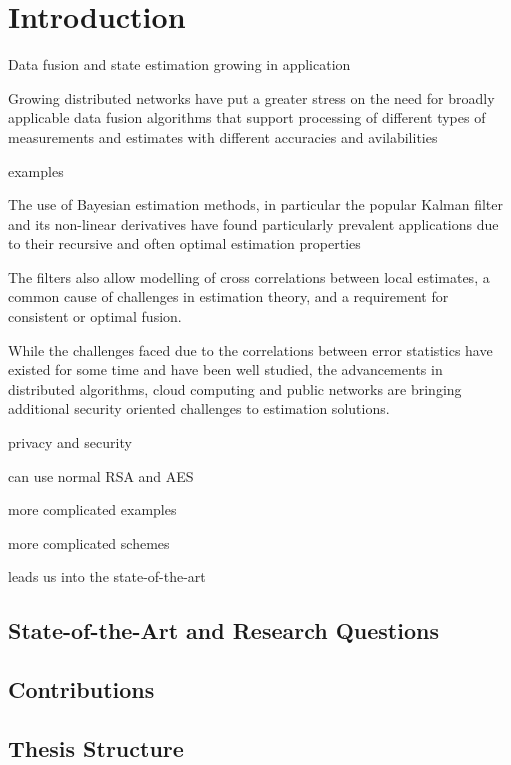 
\chapter{Introduction}

Data fusion and state estimation growing in application

Growing distributed networks have put a greater stress on the need for broadly applicable data fusion algorithms that support processing of different types of measurements and estimates with different accuracies and avilabilities

examples

The use of Bayesian estimation methods, in particular the popular Kalman filter and its non-linear derivatives have found particularly prevalent applications due to their recursive and often optimal estimation properties 

The filters also allow modelling of cross correlations between local estimates, a common cause of challenges in estimation theory, and a requirement for consistent or optimal fusion.

While the challenges faced due to the correlations between error statistics have existed for some time and have been well studied, the advancements in distributed algorithms, cloud computing and public networks are bringing additional security oriented challenges to estimation solutions.



privacy and security 

can use normal RSA and AES

more complicated examples

more complicated schemes



leads us into the state-of-the-art


\section{State-of-the-Art and Research Questions}

\section{Contributions}

\section{Thesis Structure}